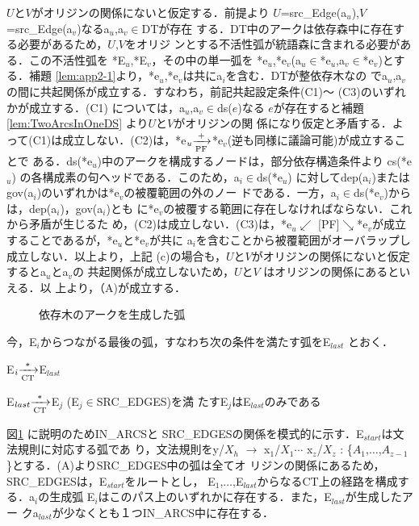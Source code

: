 \begin{lemma}[対応弧の存在]
{$U$と$V$がオリジンの関係にないと仮定する．前提より
$U$=src\_Edge(a$_u$),$V$=src\_Edge(a$_v$)なるa$_u$,a$_v{\in}$DTが存在
する．DT中のアークは依存森中に存在する必要があるため，$U$,$V$をオリジ
ンとする不活性弧が統語森に含まれる必要がある．この不活性弧を
*E$_u$,*E$_v$，その中の単一弧を
*e$_u$,*e$_v$(a$_u{\in}$*e$_u$,a$_v{\in}$*e$_v$)とする．補題
\ref{lem:app2-1}より，*e$_u$,*e$_v$は共にa$_i$を含む．DTが整依存木なの
でa$_u$,a$_v$の間に共起関係が成立する．すなわち，前記共起設定条件(C1)〜
(C3)のいずれかが成立する．(C1) については，a$_u$,a$_v{\in}$ds($e$)なる
$e$が存在すると補題\ref{lem:TwoArcsInOneDS} より$U$と$V$がオリジンの関
係になり仮定と矛盾する．よって(C1)は成立しない．(C2)は，*e$_u
{\xrightarrow[{\rm PF}]{+}}$*e$_v$(逆も同様に議論可能)が成立することで
ある．ds(*e$_u$)中のアークを構成するノードは，部分依存構造条件より
cs(*e$_u$) の各構成素の句ヘッドである．このため，a$_i{\in}$ds(*e$_u$)
に対してdep(a$_i$)またはgov(a$_i$)のいずれかは*e$_v$の被覆範囲の外のノー
ドである．一方，a$_i{\in}$ds(*e$_v$)からは，dep(a$_i$)，gov(a$_i$)とも
に*e$_v$の被覆する範囲に存在しなければならない．これから矛盾が生じるた
め，(C2)は成立しない．(C3)は，*e$_u{\swarrow}${\tiny
[PF]}${\searrow}$*e$_v$が成立することであるが，*e$_u$と*e$_v$が共に
a$_i$を含むことから被覆範囲がオーバラップし成立しない．以上より，上記
(c)の場合も，$U$と$V$がオリジンの関係にないと仮定するとa$_u$とa$_v$の
共起関係が成立しないため，$U$と$V$ はオリジンの関係にあるといえる．以
上より，（A)が成立する．

\begin{figure}[tb]
 \begin{center}
 \end{center}
\myfiglabelskip
\myfiglabelskippre
\caption{依存木のアークを生成した弧}
\myfiglabelskippost
\label{fig:CorrespondenceDT2Edge}
\end{figure}

\mygapskip
{\mynoindent}今，E$_i$からつながる最後の弧，すなわち次の条件を満たす弧をE$_{last}$
とおく．
\mygapskip

E$_i{\xrightarrow[{\rm CT}]{*}}$E$_{last}$ 

E$_{last}{\xrightarrow[{\rm CT}]{*}}$E$_j$ (E$_j{\in}$SRC\_EDGES)を満
たすE$_j$はE$_{last}$のみである
\mygapskip

{\mynoindent}図\ref{fig:CorrespondenceDT2Edge} に説明のためIN\_ARCSと
SRC\_EDGESの関係を模式的に示す．E$_{start}$は文法規則に対応する弧であ
り，文法規則をy/$X_h$ $\rightarrow$ x$_1$/$X_1{\cdots}$ x$_z$/$X_z$ :
\{$A_1$,${\ldots}$,$A_{z-1}$\}とする．(A)よりSRC\_EDGES中の弧は全てオ
リジンの関係にあるため，SRC\_EDGESは，E$_{start}$をルートとし，
E$_1$,${\ldots}$,E$_{last}$からなるCT上の経路を構成する．a$_i$の生成弧
E$_i$はこのパス上のいずれかに存在する．また，E$_{last}$が生成したアー
クa$_{last}$が少なくとも１つIN\_ARCS中に存在する．

}
\end{lemma}
